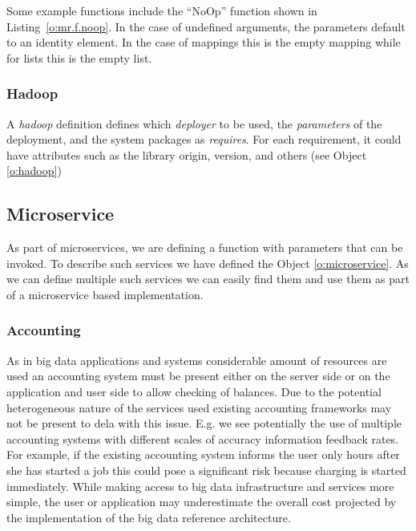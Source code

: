 \documentclass[10pt]{article}
\begin{document}


Some example functions include the ``NoOp'' function shown in
Listing~\ref{o:mr.f.noop}.  In the case of undefined arguments,
the parameters default to an identity element. In the case of mappings
this is the empty mapping while for lists this is the empty list.



\subsubsection{Hadoop}

A \textit{hadoop} definition defines which \textit{deployer} to be used,
the \textit{parameters} of the deployment, and the system packages as
\textit{requires}. For each requirement, it could have attributes such
as the library origin, version, and others (see Object \ref{o:hadoop})



\subsection{Microservice}

As part of microservices, we are defining a function with parameters
that can be invoked. To describe such services we have defined the
Object \ref {o:microservice}.  As we can define multiple such services
we can easily find them and use them as part of a microservice based
implementation.
 



 
\subsubsection{Accounting}


As in big data applications and systems considerable amount of
resources are used an accounting system must be present either on the
server side or on the application and user side to allow checking of
balances. Due to the potential heterogeneous nature of the services
used existing accounting frameworks may not be present to dela with
this issue. E.g. we see potentially the use of multiple accounting
systems with different scales of accuracy information feedback
rates. For example, if the existing accounting system informs the user
only hours after she has started a job this could pose a significant
risk because charging is started immediately. While making access to
big data infrastructure and services more simple, the user or
application may underestimate the overall cost projected by the
implementation of the big data reference architecture.
\end{document}
